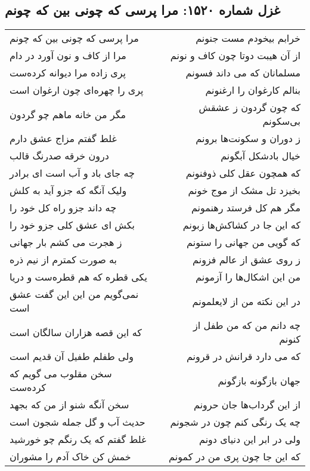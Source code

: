 \begin{center}
\section*{غزل شماره ۱۵۲۰: مرا پرسی که چونی بین که چونم}
\label{sec:1520}
\begin{longtable}{l p{0.5cm} r}
مرا پرسی که چونی بین که چونم
&&
خرابم بیخودم مست جنونم
\\
مرا از کاف و نون آورد در دام
&&
از آن هیبت دوتا چون کاف و نونم
\\
پری زاده مرا دیوانه کرده‌ست
&&
مسلمانان که می داند فسونم
\\
پری را چهره‌ای چون ارغوان است
&&
بنالم کارغوان را ارغنونم
\\
مگر من خانه ماهم چو گردون
&&
که چون گردون ز عشقش بی‌سکونم
\\
غلط گفتم مزاج عشق دارم
&&
ز دوران و سکونت‌ها برونم
\\
درون خرقه صدرنگ قالب
&&
خیال بادشکل آبگونم
\\
چه جای باد و آب است ای برادر
&&
که همچون عقل کلی ذوفنونم
\\
ولیک آنگه که جزو آید به کلش
&&
بخیزد تل مشک از موج خونم
\\
چه داند جزو راه کل خود را
&&
مگر هم کل فرستد رهنمونم
\\
بکش ای عشق کلی جزو خود را
&&
که این جا در کشاکش‌ها زبونم
\\
ز هجرت می کشم بار جهانی
&&
که گویی من جهانی را ستونم
\\
به صورت کمترم از نیم ذره
&&
ز روی عشق از عالم فزونم
\\
یکی قطره که هم قطره‌ست و دریا
&&
من این اشکال‌ها را آزمونم
\\
نمی‌گویم من این این گفت عشق است
&&
در این نکته من از لایعلمونم
\\
که این قصه هزاران سالگان است
&&
چه دانم من که من طفل از کنونم
\\
ولی طفلم طفیل آن قدیم است
&&
که می دارد قرانش در قرونم
\\
سخن مقلوب می گویم که کرده‌ست
&&
جهان بازگونه بازگونم
\\
سخن آنگه شنو از من که بجهد
&&
از این گرداب‌ها جان حرونم
\\
حدیث آب و گل جمله شجون است
&&
چه یک رنگی کنم چون در شجونم
\\
غلط گفتم که یک رنگم چو خورشید
&&
ولی در ابر این دنیای دونم
\\
خمش کن خاک آدم را مشوران
&&
که این جا چون پری من در کمونم
\\
\end{longtable}
\end{center}

